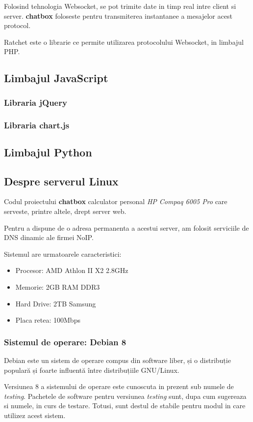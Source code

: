 \documentclass[14pt,a4paper]{extarticle}
\begin{document}
Folosind tehnologia Websocket, se pot trimite date in timp real intre 
client si server. \textbf{chatbox} foloseste pentru transmiterea instantanee
a mesajelor acest protocol.

Ratchet\citep{ratchet} este o librarie ce permite utilizarea protocolului 
Websocket, in limbajul PHP.
\subsection{Limbajul JavaScript}
\subsubsection{Libraria jQuery}
\subsubsection{Libraria chart.js}
\subsection{Limbajul Python}

\subsection{Despre serverul Linux}
Codul proiectului \textbf{chatbox} calculator personal
 \textit{HP Compaq 6005 Pro}
care serveste, printre altele, drept server web. 

Pentru a dispune de o adresa permanenta a acestui server, 
am folosit serviciile de DNS dinamic ale firmei NoIP\cite{noip}.

Sistemul are urmatoarele caracteristici:
\begin{itemize}
  \item Procesor: AMD Athlon II X2 2.8GHz
  \item Memorie: 2GB RAM DDR3
  \item Hard Drive: 2TB Samsung
  \item Placa retea: 100Mbps
\end{itemize}

\subsubsection{Sistemul de operare: Debian 8}
Debian\cite{debian} este un sistem de operare compus din software liber\cite{free}, și o distribuție populară și foarte influentă între distribuțiile GNU/Linux.

Versiunea 8 a sistemului de operare este cunoscuta in prezent sub 
numele de \textit{testing}. Pachetele de software pentru versiunea 
\textit{testing} sunt, dupa cum sugereaza si numele, in curs de testare.
Totusi, sunt destul de stabile pentru modul in care 
utilizez acest sistem.
\end{document}
